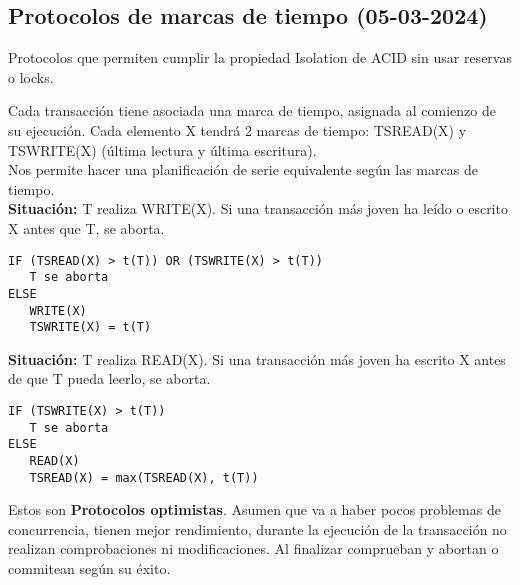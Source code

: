 \documentclass{article}
\begin{document}
\subsection{Protocolos de marcas de tiempo (05-03-2024)}
\begin{theorem}
Protocolos que permiten cumplir la propiedad Isolation de ACID sin usar reservas o locks.
\end{theorem} Cada transacción tiene asociada una marca de tiempo, asignada al comienzo de su ejecución. Cada elemento X tendrá 2 marcas de tiempo: TSREAD(X) y TSWRITE(X) (última lectura y última escritura).\\
Nos permite hacer una planificación de serie equivalente según las marcas de tiempo. \\
\textbf{Situación:} T realiza WRITE(X). Si una transacción más joven ha leído o escrito X antes que T, se aborta. 
\begin{verbatim}
IF (TSREAD(X) > t(T)) OR (TSWRITE(X) > t(T))
   T se aborta
ELSE
   WRITE(X)
   TSWRITE(X) = t(T)
\end{verbatim}
\textbf{Situación:} T realiza READ(X). Si una transacción más joven ha escrito X antes de que T pueda leerlo, se aborta.
\begin{verbatim}
IF (TSWRITE(X) > t(T))
   T se aborta
ELSE
   READ(X) 
   TSREAD(X) = max(TSREAD(X), t(T))
\end{verbatim}
Estos son \textbf{Protocolos optimistas}. Asumen que va a haber pocos problemas de concurrencia, tienen mejor rendimiento, durante la ejecución de la transacción no realizan comprobaciones ni modificaciones. Al finalizar comprueban y abortan o commitean según su éxito.
\end{document}
